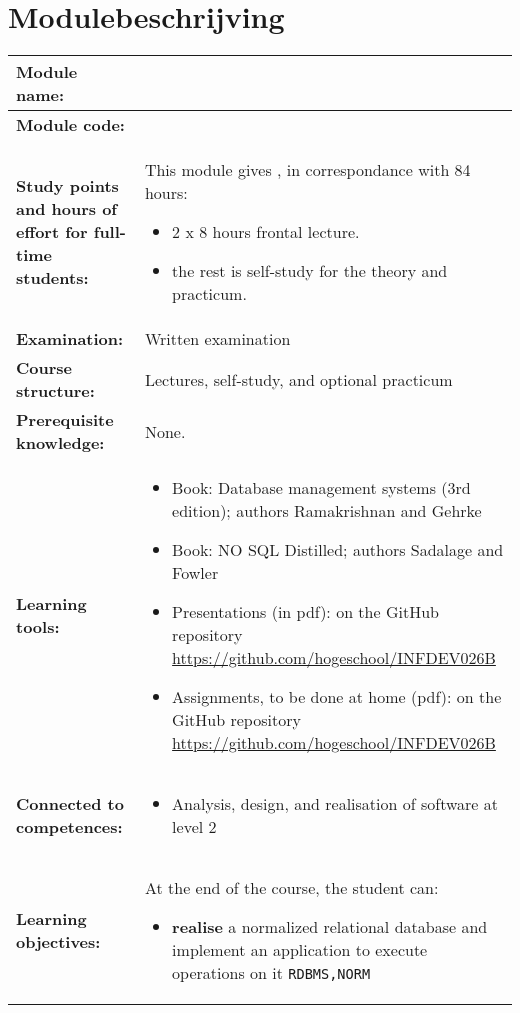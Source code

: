\section*{Modulebeschrijving}
\begin{tabularx}{\textwidth}{|>{\columncolor{lichtGrijs}} p{}|X|}
	\hline
	\textbf{Module name:} & \modulenaam\\
	\hline
	\textbf{Module code: }& \modulecode\\
	\hline
	\textbf{Study points \newline and hours of effort for full-time students:} & This module gives \stdPunten, in correspondance with 84 hours:
	\begin{itemize}
		\item 2 x 8 hours frontal lecture.
		\item the rest is self-study for the theory and practicum.
	\end{itemize} \\
	\hline
	\textbf{Examination:} & Written examination \\
	\hline
	\textbf{Course structure:} & Lectures, self-study, and optional practicum \\
	\hline
	\textbf{Prerequisite knowledge:} & None. \\
	\hline
	\textbf{Learning tools:}  &
		\begin{itemize}
			\item Book: Database management systems (3rd edition); authors Ramakrishnan and Gehrke
			\item Book: NO SQL Distilled; authors Sadalage and Fowler
			\item Presentations (in pdf):  on the GitHub repository \url{https://github.com/hogeschool/INFDEV026B}
			\item Assignments, to be done at home (pdf): on the GitHub repository \url{https://github.com/hogeschool/INFDEV026B}
		\end{itemize} \\
	\hline
	\textbf{Connected to \newline competences:} &
		\begin{itemize}
			\item Analysis, design, and realisation of software at level 2
		\end{itemize} \\
	\hline
	\textbf{Learning objectives:} &
		At the end of the course, the student can:
			\begin{itemize}
				\item \textbf{realise} a normalized relational database and implement an application to execute operations on it \texttt{RDBMS,NORM}


\end{itemize}
\end{tabularx}
